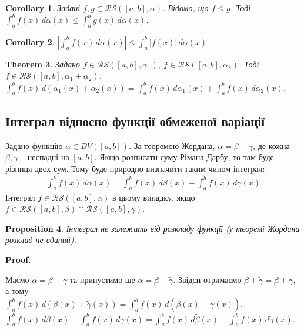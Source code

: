 \documentclass[a4paper, 10pt]{article}
\makeatletter
\def\qed{$\blacksquare$}
\theoremstyle{theoremdd}
\newtheorem{theorem}{Theorem}[subsection]
\theoremstyle{theoremdd}
\theoremstyle{theoremdd}
\theoremstyle{theoremdd}
\theoremstyle{theoremdd}
\theoremstyle{theoremdd}
\newtheorem{proposition}[theorem]{Proposition}
\theoremstyle{theoremdd}
\theoremstyle{theoremdd}
\theoremstyle{theoremdd}
\newtheorem{corollary}[theorem]{Corollary}
\renewenvironment{proof}[1][Proof.\\]{\par
\pushQED{\hfill \qed}%
\normalfont \topsep6\p@\@plus6\p@\relax
\trivlist
\item\relax
{\bfseries
#1\@addpunct{.}}\hspace\labelsep\ignorespaces
}{%
\popQED\endtrivlist\@endpefalse
}
\makeatother
\begin{document}
\begin{corollary}
Задані $f,g \in \mathcal{RS}([a,b],\alpha)$. Відомо, що $f \leq g$. Тоді $\displaystyle\int_a^b f(x)\,d\alpha(x) \leq \int_a^b g(x)\,d\alpha(x)$.
\end{corollary}

\begin{corollary}
$\displaystyle\left| \int_a^b f(x)\,d\alpha(x) \right| \leq \int_a^b |f(x)|\,d\alpha(x)$
\end{corollary}

\begin{theorem}
Задано $f \in \mathcal{RS}([a,b],\alpha_1),\ f \in \mathcal{RS}([a,b],\alpha_2)$. Тоді $f \in \mathcal{RS}([a,b],\alpha_1+\alpha_2)$.\\
$\displaystyle\int_a^b f(x)\,d(\alpha_1(x) + \alpha_2(x)) = \int_a^b f(x)\,d\alpha_1(x) + \int_a^b f(x)\,d\alpha_2(x)$.
\end{theorem}

\subsection{Інтеграл відносно функції обмеженої варіації}
Задано функцію $\alpha \in BV([a,b])$. За теоремою Жордана, $\alpha = \beta - \gamma$, де кожна $\beta,\gamma$ -- неспадні на $[a,b]$. Якщо розписати суму Рімана-Дарбу, то там буде різниця двох сум. Тому буде природно визначити таким чином інтеграл:
\begin{align*}
\int_a^b f(x)\,d\alpha(x) = \int_a^b f(x)\,d\beta(x) - \int_a^b f(x)\,d\gamma(x)
\end{align*}
\noindent
Інтеграл $f \in \mathcal{RS}([a,b],\alpha)$ в цьому випадку, якщо $f \in \mathcal{RS}([a,b],\beta) \cap \mathcal{RS}([a,b],\gamma)$.

\begin{proposition}
Інтеграл не залежить від розкладу функції (у теоремі Жордана розклад не єдиний).
\end{proposition}

\begin{proof}
Маємо $\alpha = \beta - \gamma$ та припустимо ще $\alpha = \tilde{\beta} - \tilde{\gamma}$. Звідси отримаємо $\beta + \tilde{\gamma} = \tilde{\beta} + \gamma$, а тому\\
$\displaystyle\int_a^b f(x)\,d(\beta(x) + \tilde{\gamma}(x)) = \int_a^b f(x)\,d(\tilde{\beta}(x) + \gamma(x))$.\\
$\displaystyle\int_a^b f(x)\,d\beta(x) - \int_a^b f(x)\,d\gamma(x) = \int_a^b f(x)\,d\tilde{\beta}(x) - \int_a^b f(x)\,d\tilde{\gamma}(x)$.
\end{proof}
\end{document}

